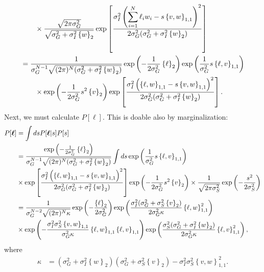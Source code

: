 \documentclass[11pt]{article}
\begin{document}
\begin{align}
	&\qquad \times \frac{\sqrt{2\pi \sigma_G^2}}{\sqrt{\sigma_G^2 + \sigma_I^2 \left\{w\right\}_2}}\exp\left[\frac{\sigma_I^2\left(\displaystyle\sum_{i=1}^N \ell_i w_i - s  \left\{v,w\right\}_{1,1}\right)^2}{2 \sigma_G^2 (\sigma_G^2 + \sigma_I^2 \left\{w\right\}_2)}\right] \\
	&= \frac{1}{\sigma_G^{N-1}\sqrt{(2\pi)^N(\sigma_G^2 + \sigma_I^2 \left\{w\right\}_2)}}\exp\left(-\frac{1}{2\sigma_G^2}\left\{\ell \right\}_2\right)\exp\left(\frac{1}{\sigma_G^2} s\left\{\ell, v\right\}_{1,1}\right) \notag \\
	&\qquad \times \exp\left(-\frac{1}{2\sigma_G^2}s^2 \left\{v\right\}_2\right)\exp\left[\frac{\sigma_I^2\left(\left\{\ell, w\right\}_{1,1} - s  \left\{v,w\right\}_{1,1}\right)^2}{2\sigma_G^2 (\sigma_G^2 + \sigma_I^2 \left\{w\right\}_2)}\right].
\end{align}
Next, we must calculate $P[\boldsymbol{\ell}]$. This is doable also by marginalization:
\begin{align}
	P[\boldsymbol{\ell}] &= \int ds P[\boldsymbol{\ell}|s] P[s] \\
	&= \frac{\exp\left(-\frac{1}{2\sigma_G^2}\left\{\ell \right\}_2\right)}{\sigma_G^{N-1}\sqrt{(2\pi)^N(\sigma_G^2 + \sigma_I^2 \left\{w\right\}_2)}} \int ds \exp\left(\frac{1}{\sigma_G^2} s\left\{\ell, v\right\}_{1,1}\right) \\
	&\times \exp\left[\frac{\sigma_I^2\left(\left\{\ell, w\right\}_{1,1} - s \left\{v,w\right\}_{1,1}\right)^2}{2\sigma_G^2 (\sigma_G^2 + \sigma_I^2 \left\{w\right\}_2)}\right]\exp\left(-\frac{1}{2\sigma_G^2}s^2 \left\{v\right\}_2\right)\times \frac{1}{\sqrt{2\pi \sigma_S^2}} \exp\left(-\frac{s^2}{2\sigma_S^2}\right) \\
	&= \frac{1}{\sigma_G^{N-2}\sqrt{(2\pi)^N \kappa}}  \exp\left(-\frac{\left\{\ell \right\}_2}{2\sigma_G^2}\right) \exp\left( \frac{\sigma_I^2(\sigma_G^2 + \sigma_S^2 \left\{v\right\}_2)}{2 \sigma_G^2 \kappa} \left\{\ell, w\right\}_{1,1}^2\right) \notag \\
	& \times \exp\left(-\frac{\sigma_I^2 \sigma_S^2\left\{v,w\right\}_{1,1}}{\sigma_G^2\kappa} \left\{\ell, w\right\}_{1,1} \left\{\ell, v\right\}_{1,1} \right) \exp\left(\frac{\sigma_S^2 (\sigma_G^2 + \sigma_I^2 \left\{w\right\}_2)}{2 \sigma_G^2 \kappa} \left\{\ell, v\right\}_{1,1}^2\right),
\end{align}
where 
\begin{align}
	\kappa &= \left(\sigma_G^2 + \sigma_I^2 \left\{w\right\}_2\right)\left(\sigma_G^2 + \sigma_S^2 \left\{v\right\}_2\right) - \sigma_I^2 \sigma_S^2 \left\{v,w\right\}_{1,1}^2.
\end{align}
\end{document}
